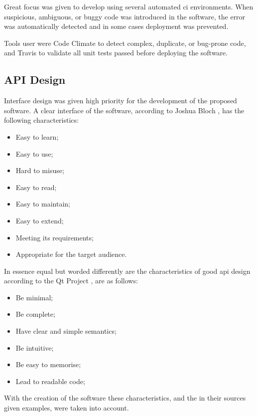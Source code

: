Great focus was given to develop using several automated \gls{ci}
environments. When suspicious, ambiguous, or buggy code was introduced
in the software, the error was automatically detected and in some cases
deployment was prevented.

Tools user were Code Climate \autocite{codeclimate.com} to detect
complex, duplicate, or bug-prone code, and Travis
\autocite{travis-ci.org} to validate all unit tests passed before
deploying the software.

\subsection{API Design}\label{design-1}

Interface design was given high priority for the development of the
proposed software. A clear interface of the software, according to
Joshua Bloch \autocite*{bloch-joshua-how-design-good-api-why-matters},
has the following characteristics:

\begin{itemize}
\itemsep1pt\parskip0pt
\item
  Easy to learn;
\item
  Easy to use;
\item
  Hard to misuse;
\item
  Easy to read;
\item
  Easy to maintain;
\item
  Easy to extend;
\item
  Meeting its requirements;
\item
  Appropriate for the target audience.
\end{itemize}

In essence equal but worded differently are the characteristics of good
\gls{api} design according to the Qt Project
\autocite{qt-project.org-api-design-principles}, are as follows:

\begin{itemize}
\itemsep1pt\parskip0pt
\item
  Be minimal;
\item
  Be complete;
\item
  Have clear and simple semantics;
\item
  Be intuitive;
\item
  Be easy to memorise;
\item
  Lead to readable code;
\end{itemize}

With the creation of the software these characteristics, and the in
their sources given examples, were taken into account.

